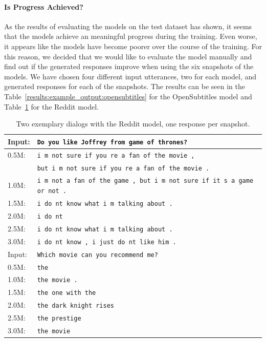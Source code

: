 
\paragraph{Is Progress Achieved?} As the results of evaluating the models on the test dataset has shown, it seems that the models achieve an meaningful progress during the training. Even worse, it appears like the models have become poorer over the course of the training. For this reason, we decided that we would like to evaluate the model manually and find out if the generated responses improve when using the six snapshots of the models. We have chosen four different input utterances, two for each model, and generated responses for each of the snapshots. The results can be seen in the Table~\ref{results:example_output:opensubtitles} for the OpenSubtitles model and Table~\ref{results:example_output:reddit} for the Reddit model.

\begin{table}[H]
	\centering
	\begin{adjustbox}{max width=\textwidth}
		\begin{tabular}{ll}
			\toprule
			Input: 	& \texttt{Do you like Joffrey from game of thrones?}\\
			\midrule
			0.5M: 	& \texttt{i m not sure if you re a fan of the movie ,}\\
			& \texttt{but i m not sure if you re a fan of the movie .}\\
			1.0M: 	& \texttt{i m not a fan of the game , but i m not sure if it s a game or not .}\\
			1.5M:	& \texttt{i do nt know what i m talking about .}\\
			2.0M:	& \texttt{i do nt }\\
			2.5M:	& \texttt{i do nt know what i m talking about .}\\
			3.0M:	& \texttt{i do nt know , i just do nt like him .}\\
			\midrule
			Input: 	& \texttt{Which movie can you recommend me?}\\
			\midrule
			0.5M: 	& \texttt{the}\\
			1.0M: 	& \texttt{the movie .}\\
			1.5M:	& \texttt{the one with the}\\
			2.0M:	& \texttt{the dark knight rises}\\
			2.5M:	& \texttt{the prestige}\\
			3.0M:	& \texttt{the movie}\\
			\bottomrule
		\end{tabular}
	\end{adjustbox}
	\caption{Two exemplary dialogs with the Reddit model, one response per snapshot.}
	\label{results:example_output:reddit}
\end{table}

